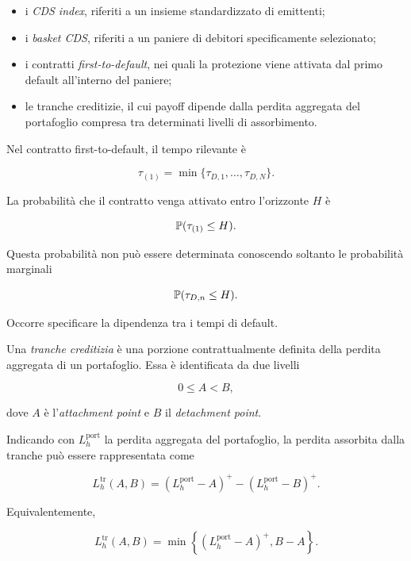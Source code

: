 \begin{itemize}

\item i \emph{CDS index}, riferiti a un insieme standardizzato di
emittenti;

\item i \emph{basket CDS}, riferiti a un paniere di debitori
specificamente selezionato;

\item i contratti \emph{first-to-default}, nei quali la protezione
viene attivata dal primo default all'interno del paniere;

\item le tranche creditizie, il cui payoff dipende dalla perdita
aggregata del portafoglio compresa tra determinati livelli di
assorbimento.

\end{itemize}

Nel contratto first-to-default, il tempo rilevante \`{e}

\[
\tau_{(1)}
=
\min
\{
\tau_{D,1},
\ldots,
\tau_{D,N}
\}.
\]

La probabilit\`{a} che il contratto venga attivato entro l'orizzonte
$H$ \`{e}

\[
\mathbb{P}(\tau_{(1)}\leq H).
\]

Questa probabilit\`{a} non pu\`{o} essere determinata conoscendo
soltanto le probabilit\`{a} marginali

\[
\mathbb{P}(\tau_{D,n}\leq H).
\]

Occorre specificare la dipendenza tra i tempi di default.

\begin{definition}
Una \emph{tranche creditizia} \`{e} una porzione contrattualmente
definita della perdita aggregata di un portafoglio. Essa \`{e}
identificata da due livelli

\[
0\leq A<B,
\]

dove $A$ \`{e} l'\emph{attachment point} e $B$ il
\emph{detachment point}.
\end{definition}

Indicando con $L_h^{\mathrm{port}}$ la perdita aggregata del
portafoglio, la perdita assorbita dalla tranche pu\`{o} essere
rappresentata come

\[
L_h^{\mathrm{tr}}(A,B)
=
\left(
L_h^{\mathrm{port}}-A
\right)^{+}
-
\left(
L_h^{\mathrm{port}}-B
\right)^{+}.
\]

Equivalentemente,

\[
L_h^{\mathrm{tr}}(A,B)
=
\min
\left\{
\left(
L_h^{\mathrm{port}}-A
\right)^{+},
B-A
\right\}.
\]

